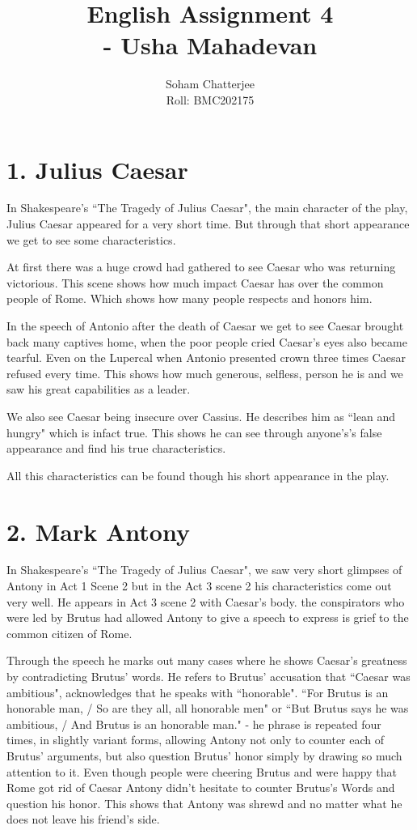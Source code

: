 \documentclass{article}
\title{\huge{English Assignment 4\\\hspace{7cm}- Usha Mahadevan}
}
\author{Soham Chatterjee\\Roll: BMC202175}
\date{}
\begin{document}
	\maketitle\pagebreak
	\section*{1. Julius Caesar}
	In Shakespeare's ``The Tragedy of Julius Caesar",  the main character of the play, Julius Caesar appeared for a very short time. But through that short appearance we get to see some characteristics.
	
	At first there was a huge crowd had gathered to see Caesar who was returning victorious. This scene shows how much impact Caesar has over the common people of Rome. Which shows how many people respects and honors him.
	
	In the speech of Antonio after the death of Caesar we get to see Caesar brought back many captives home, when the poor people cried Caesar's eyes also became tearful. Even on the Lupercal when Antonio presented crown three times Caesar refused every time. This shows how much generous, selfless, person he is and we saw his great capabilities as a leader.
	
	We also see Caesar being insecure over Cassius. He describes him as ``lean and hungry" which is infact true. This shows he can see through anyone's's false appearance and find his true characteristics.
	
	All this characteristics can be found though his short appearance in the play.

		
	\section*{2. Mark Antony}
	In Shakespeare's ``The Tragedy of Julius Caesar", we saw very short glimpses of Antony in Act 1 Scene 2 but in the Act 3 scene 2 his characteristics come out very well. He appears in Act 3 scene 2 with Caesar's body. the conspirators who were led by Brutus had allowed Antony to give a speech to express is grief to the common citizen of Rome.
	
	Through the speech he marks out many cases where he shows Caesar's greatness by contradicting Brutus' words. He refers to Brutus' accusation that ``Caesar was ambitious", acknowledges that he speaks with ``honorable". ``For Brutus is an honorable man, / So are they all, all honorable men" or ``But Brutus says he was ambitious, / And Brutus is an honorable man." - he phrase is repeated four times, in slightly variant forms, allowing Antony not only to counter each of Brutus' arguments, but also question Brutus' honor simply by drawing so much attention to it. Even though people were cheering Brutus and were happy that Rome got rid of Caesar Antony didn't hesitate to counter Brutus's Words and question his honor. This shows that Antony was shrewd and no matter what he does not leave his friend's side.
	
\end{document}
